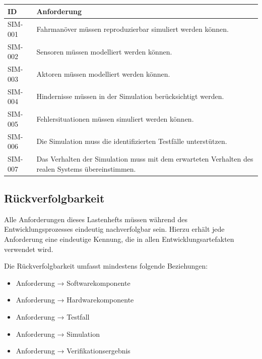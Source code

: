 \documentclass[
  a4paper,
  12pt,
  DIV=12,        %
  parskip=half,  %
  headings=small %
]{scrartcl}
\theoremstyle{definition}
\providecommand{\tightlist}{%
  \setlength{\itemsep}{0pt}\setlength{\parskip}{0pt}}
\theoremstyle{definition}
\begin{document}
\begin{longtable}[]{@{}
  >{\raggedright\arraybackslash}p{}
  >{\raggedright\arraybackslash}p{}@{}}
\toprule\noalign{}
\begin{minipage}[b]{\linewidth}\raggedright
ID
\end{minipage} & \begin{minipage}[b]{\linewidth}\raggedright
Anforderung
\end{minipage} \\
\midrule\noalign{}
\endhead
\bottomrule\noalign{}
\endlastfoot
SIM-001 & Fahrmanöver müssen reproduzierbar simuliert werden können. \\
SIM-002 & Sensoren müssen modelliert werden können. \\
SIM-003 & Aktoren müssen modelliert werden können. \\
SIM-004 & Hindernisse müssen in der Simulation berücksichtigt werden. \\
SIM-005 & Fehlersituationen müssen simuliert werden können. \\
SIM-006 & Die Simulation muss die identifizierten Testfälle
unterstützen. \\
SIM-007 & Das Verhalten der Simulation muss mit dem erwarteten Verhalten
des realen Systems übereinstimmen. \\
\end{longtable}

\subsection{Rückverfolgbarkeit}\label{ruxfcckverfolgbarkeit}

Alle Anforderungen dieses Lastenhefts müssen während des
Entwicklungsprozesses eindeutig nachverfolgbar sein. Hierzu erhält jede
Anforderung eine eindeutige Kennung, die in allen Entwicklungsartefakten
verwendet wird.

Die Rückverfolgbarkeit umfasst mindestens folgende Beziehungen:

\begin{itemize}
\tightlist
\item
  Anforderung → Softwarekomponente
\item
  Anforderung → Hardwarekomponente
\item
  Anforderung → Testfall
\item
  Anforderung → Simulation
\item
  Anforderung → Verifikationsergebnis
\end{itemize}
\end{document}
